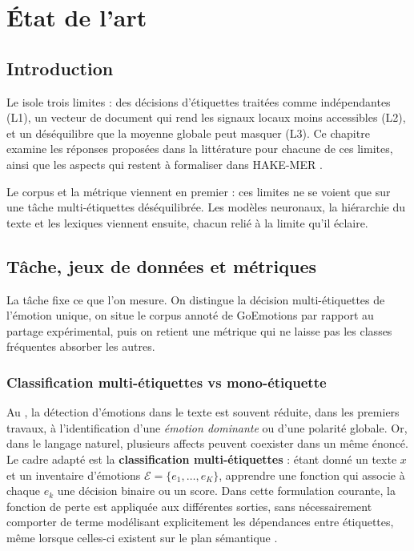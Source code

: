 \chapter{État de l'art}

\section*{Introduction}

Le  isole trois limites : des décisions d'étiquettes
traitées comme indépendantes (L1), un vecteur de document qui rend les
signaux locaux moins accessibles (L2), et un déséquilibre que la moyenne
globale peut masquer (L3). Ce chapitre examine les réponses proposées
dans la littérature pour chacune de ces limites, ainsi que les aspects
qui restent à formaliser dans HAKE-MER
\cite{mohammad2020sentiment,pang2008,seyeditabari2018}.

Le corpus et la métrique viennent en premier : ces limites ne se voient
que sur une tâche multi-étiquettes déséquilibrée. Les modèles neuronaux,
la hiérarchie du texte et les lexiques viennent ensuite, chacun relié à
la limite qu'il éclaire.

\section{Tâche, jeux de données et métriques}
\label{sec:etat-tache-donnees}

La tâche fixe ce que l'on mesure. On distingue la décision
multi-étiquettes de l'émotion unique, on situe le corpus annoté de
GoEmotions par rapport au partage expérimental, puis on retient une
métrique qui ne laisse pas les classes fréquentes absorber les autres.

\subsection{Classification multi-étiquettes vs mono-étiquette}

Au , la détection
d'émotions dans le texte est souvent réduite, dans les premiers
travaux, à l'identification d'une \emph{émotion dominante}
ou d'une polarité globale. Or, dans le langage naturel, plusieurs
affects peuvent coexister dans un même énoncé. Le cadre adapté est
la \textbf{classification multi-étiquettes} : étant donné un texte
$x$ et un inventaire d'émotions $\mathcal{E}=\{e_1,\dots,e_K\}$,
apprendre une fonction qui associe à chaque $e_k$ une décision binaire ou
un score. Dans cette formulation courante, la fonction de perte est
appliquée aux différentes sorties, sans nécessairement comporter de
terme modélisant explicitement les dépendances entre étiquettes, même
lorsque celles-ci existent sur le plan sémantique
\cite{zhang2014multilabel,read2009classifier,read2019classifier}.

